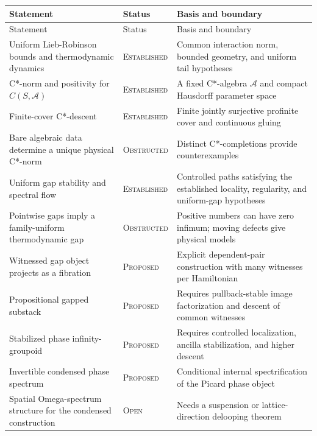 \documentclass[12pt]{article}
\theoremstyle{definition}
\theoremstyle{remark}
\newcommand{\A}{\mathcal A}
\newcommand{\EST}{\textnormal{\textsc{Established}}}
\newcommand{\PROP}{\textnormal{\textsc{Proposed}}}
\newcommand{\OPEN}{\textnormal{\textsc{Open}}}
\newcommand{\OBST}{\textnormal{\textsc{Obstructed}}}
\begin{document}
\begin{longtable}{>{\raggedright\arraybackslash}p{}
                  >{\raggedright\arraybackslash}p{}
                  >{\raggedright\arraybackslash}p{}}
\toprule
Statement & Status & Basis and boundary \\
\midrule
\endfirsthead
\toprule
Statement & Status & Basis and boundary \\
\midrule
\endhead
Uniform Lieb-Robinson bounds and thermodynamic dynamics
& \EST{}
& Common interaction norm, bounded geometry, and uniform tail hypotheses \\

C*-norm and positivity for $C(S,\A)$
& \EST{}
& A fixed C*-algebra $\A$ and compact Hausdorff parameter space \\

Finite-cover C*-descent
& \EST{}
& Finite jointly surjective profinite cover and continuous gluing \\

Bare algebraic data determine a unique physical C*-norm
& \OBST{}
& Distinct C*-completions provide counterexamples \\

Uniform gap stability and spectral flow
& \EST{}
& Controlled paths satisfying the established locality, regularity, and uniform-gap hypotheses \\

Pointwise gaps imply a family-uniform thermodynamic gap
& \OBST{}
& Positive numbers can have zero infimum; moving defects give physical models \\

Witnessed gap object projects as a fibration
& \PROP{}
& Explicit dependent-pair construction with many witnesses per Hamiltonian \\

Propositional gapped substack
& \PROP{}
& Requires pullback-stable image factorization and descent of common witnesses \\

Stabilized phase infinity-groupoid
& \PROP{}
& Requires controlled localization, ancilla stabilization, and higher descent \\

Invertible condensed phase spectrum
& \PROP{}
& Conditional internal spectrification of the Picard phase object \\

Spatial Omega-spectrum structure for the condensed construction
& \OPEN{}
& Needs a suspension or lattice-direction delooping theorem \\


\end{longtable}
\end{document}

